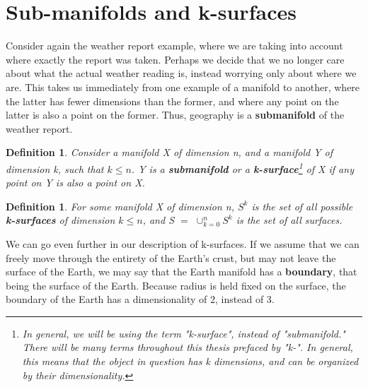 \documentclass{book}
\newtheorem{defn}[equation]{Definition}
\begin{document}
\section{Sub-manifolds and k-surfaces}

Consider again the weather report example, where we are taking into account where exactly the report was taken. Perhaps we decide that we no longer care about what the actual weather reading is, instead worrying only about where we are. This takes us immediately from one example of a manifold to another, where the latter has fewer dimensions than the former, and where any point on the latter is also a point on the former. Thus, geography is a \textbf{submanifold} of the weather report.


\begin{defn}
	Consider a manifold X of dimension n, and a manifold Y of dimension k, such that $k \leq n$. Y is a \textbf{submanifold} or a \textbf{k-surface}\footnote{In general, we will be using the term "k-surface", instead of "submanifold." There will be many terms throughout this thesis prefaced by "k-". In general, this means that the object in question has k dimensions, and can be organized by their dimensionality.} of X if any point on Y is also a point on X. 
\end{defn}



\begin{center}
\end{center}



\begin{defn}
	For some manifold X of dimension n, $S^k$ is the set of all possible \textbf{k-surfaces} of dimension $k \leq n$, and S $=$ $\cup^n_{k=0}S^k$ is the set of all surfaces. 
\end{defn}

We can go even further in our description of k-surfaces. If we assume that we can freely move through the entirety of the Earth's crust, but may not leave the surface of the Earth, we may say that the Earth manifold has a \textbf{boundary}, that being the surface of the Earth. Because radius is held fixed on the surface, the boundary of the Earth has a dimensionality of 2, instead of 3. 
\end{document}
